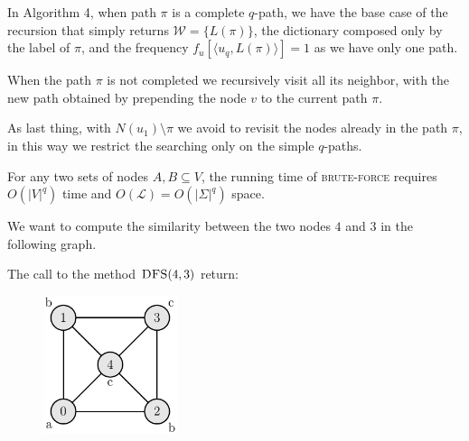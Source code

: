 	In Algorithm 4, when path $\pi$ is a complete $q$-path, we have the base case of the recursion that simply returns $\mathcal{W} = \{ L(\pi) \}$, 
	the dictionary composed only by the label of $\pi$, and the frequency $f_{u}[\langle u_{q}, L(\pi) \rangle] = 1$ as we have only one path.
	
	When the path $\pi$ is not completed we recursively visit all its neighbor, with the new path obtained by prepending the node $v$ to the current path $\pi$.\\
	
	\clearpage
	
	As last thing, with $N(u_{1}) \setminus \pi$ we avoid to revisit the nodes already in the path $\pi$, in this way we restrict the searching only on the simple $q$-paths.
	
	\begin{lemma}
		For any two sets of nodes $A, B \subseteq V$, the running time of \textsc{brute-force} requires $O(|V|^{q})$ time and $O(\mathcal{L}) = O(|\Sigma|^{q})$ space.
	\end{lemma}

	\begin{esempio}
		We want to compute the similarity between the two nodes $4$ and $3$ in the following graph.	
	\end{esempio}



	

		The call to the method $\textsc{DFS}(4, 3)$ return:
		
		\begin{figure}
			\includegraphics[width=0.35\textwidth]{figure/figure-3-2}
		\end{figure}
	
